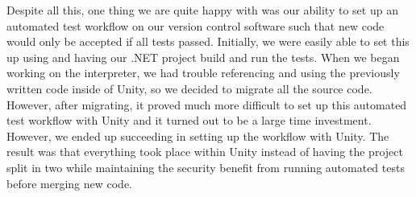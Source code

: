 Despite all this, one thing we are quite happy with was our ability to set up an automated test workflow on our version control software such that new code would only be accepted if all tests passed.
Initially, we were easily able to set this up using and having our .NET project build and run the tests.
When we began working on the interpreter, we had trouble referencing and using the previously written code inside of Unity, so we decided to migrate all the source code.
However, after migrating, it proved much more difficult to set up this automated test workflow with Unity and it turned out to be a large time investment.
However, we ended up succeeding in setting up the workflow with Unity.
The result was that everything took place within Unity instead of having the project split in two while maintaining the security benefit from running automated tests before merging new code.